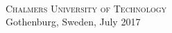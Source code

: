 \thispagestyle{empty}
\begin{center}
	\textbf{\Large\varHeadline} \\[1cm]
	{\large \varSubtitle}\\[1cm]
	{\large \varNames}
	
	\vfill	
	
	\varDepartment \\
	\textsc{Chalmers University of Technology} \\
	Gothenburg, Sweden, July 2017 \\
\end{center}

\setlength{\parindent}{1cm}                         
